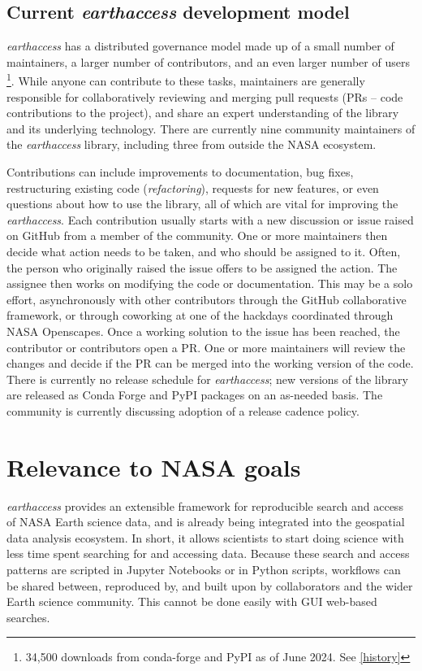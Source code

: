 \documentclass{ROSES-NASA-proposal}
\newcommand{\earthaccess}{\textit{earthaccess}\xspace} %
\begin{document}
\subsection{Current \earthaccess development model}

\earthaccess has a distributed governance model made up of a small number of maintainers, a larger number of contributors, and an even larger number of users \footnote{34,500 downloads from conda-forge and PyPI as of June 2024. See \ref{history}}. While anyone can contribute to these tasks, maintainers are generally responsible for collaboratively reviewing and merging pull requests (PRs -- code contributions to the project), and share an expert understanding of the library and its underlying technology. There are currently nine community maintainers of the \earthaccess library, including three from outside the NASA ecosystem.

Contributions can include improvements to documentation, bug fixes, restructuring existing code (\textit{refactoring}), requests for new features, or even questions about how to use the library, all of which are vital for improving the \earthaccess. Each contribution usually starts with a new discussion or issue raised on GitHub from a member of the community. One or more maintainers then decide what action needs to be taken, and who should be assigned to it. Often, the person who originally raised the issue offers to be assigned the action. The assignee then works on modifying the code or documentation. This may be a solo effort, asynchronously with other contributors through the GitHub collaborative framework, or through coworking at one of the hackdays coordinated through NASA Openscapes. Once a working solution to the issue has been reached, the contributor or contributors open a PR. One or more maintainers will review the changes and decide if the PR can be merged into the working version of the code. There is currently no release schedule for \earthaccess; new versions of the library are released as Conda Forge and PyPI packages on an as-needed basis. The community is currently discussing adoption of a release cadence policy.


\section{Relevance to NASA goals}

\earthaccess provides an extensible framework for reproducible search and access of NASA Earth science data, and is already being integrated into the geospatial data analysis ecosystem. In short, it allows scientists to start doing science with less time spent searching for and accessing data. Because these search and access patterns are scripted in Jupyter Notebooks or in Python scripts, workflows can be shared between, reproduced by, and built upon by collaborators and the wider Earth science community. This cannot be done easily with GUI web-based searches.
\end{document}
